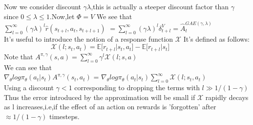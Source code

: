 \begin{itemize}
    Now we consider discount {\bf${\gamma\lambda}$},this is actually a steeper discount factor than ${\gamma}$ since ${0{\leq}\lambda{\leq}1}.$Now,let ${\Phi = V}$ We see that\\
    ${\sum_{l=0}^{\infty}{(\gamma\lambda)^{l}\hat{r}(s_{t+l},a_t,s_{t+l+1})}}$
    $={\sum_{l=0}^{\infty}{(\gamma\lambda)^{l}{\delta}^{V}_{t+l}}}=\hat{A}^{GAE({\gamma,\lambda})}_t$\\
    It's useful to introduce the notion of a response function $\mathcal{X}$
    It's defined as follows:\\
    $~~~~~~~~~~~~~~~~~~~~~~~~~~~~~~~\mathcal{X}(l;s_t,a_t)=\mathbb{E}\big[{r_{t+l}|s_t,a_t}\big]-\mathbb{E}\big[{r_{t+l}|s_t}\big]$\\
    Note that ${A^{\pi,\gamma}(s,a)}=\sum_{l=0}^{\infty}{\gamma}^{l}{\mathcal{X}(l;s,a)}$\\
    We can see that \\
    ${\nabla_{\theta} log {\pi}_{\theta}(a_t|s_t)A^{\pi,\gamma}(s_t,a_t)}$ = ${\nabla_{\theta}log {\pi}_{\theta}(a_t|s_t){\sum_{l=0}^{\infty}\mathcal{X}(l;s_t,a_t)}}$\\
    Using a discount ${\gamma <1}$ corresponding to dropping the terms with $l \gg 1/(1-{\gamma})$\\
    Thus the error introduced by the approximation will be small if ${\mathcal{X}}$ rapidly decays as l increases,i.e,if the effect of an action on rewards is 'forgotten' after $\approx 1/(1-\gamma)$ timesteps.
    
\end{itemize} 


